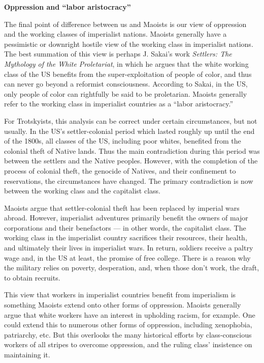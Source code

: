 \textbf{Oppression and ``labor aristocracy''}

The final point of difference between us and Maoists is our view of oppression and the working classes of imperialist nations. Maoists generally have a pessimistic or downright hostile view of the working class in imperialist nations. The best summation of this view is perhaps J. Sakai's work \emph{Settlers: The Mythology of the White Proletariat}, in which he argues that the white working class of the US benefits from the super-exploitation of people of color, and thus can never go beyond a reformist consciousness. According to Sakai, in the US, only people of color can rightfully be said to be proletarian. Maoists generally refer to the working class in imperialist countries as a ``labor aristocracy.''

For Trotskyists, this analysis can be correct under certain circumstances, but not usually. In the US's settler-colonial period which lasted roughly up until the end of the 1800s, all classes of the US, including poor whites, benefited from the colonial theft of Native lands. Thus the main contradiction during this period was between the settlers and the Native peoples. However, with the completion of the process of colonial theft, the genocide of Natives, and their confinement to reservations, the circumstances have changed. The primary contradiction is now between the working class and the capitalist class.

Maoists argue that settler-colonial theft has been replaced by imperial wars abroad. However, imperialist adventures primarily benefit the owners of major corporations and their benefactors --- in other words, the capitalist class. The working class in the imperialist country sacrifices their resources, their health, and ultimately their lives in imperialist wars. In return, soldiers receive a paltry wage and, in the US at least, the promise of free college. There is a reason why the military relies on poverty, desperation, and, when those don't work, the draft, to obtain recruits.

This view that workers in imperialist countries benefit from imperialism is something Maoists extend onto other forms of oppression. Maoists generally argue that white workers have an interest in upholding racism, for example. One could extend this to numerous other forms of oppression, including xenophobia, patriarchy, etc. But this overlooks the many historical efforts by class-conscious workers of all stripes to overcome oppression, and the ruling class' insistence on maintaining it.

